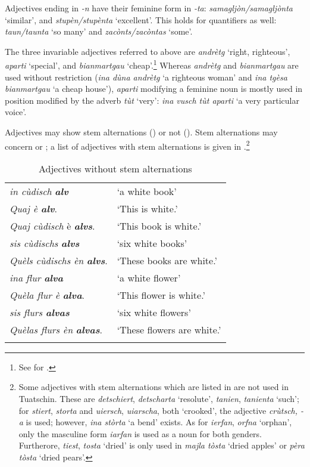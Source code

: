 Adjectives ending in \textit{-n} have their feminine form in \textit{-ta}: \textit{samagljòn/samagljònta} `similar', and  \textit{stupèn/stupènta} `excellent'. This holds for quantifiers as well: \textit{taun{\slash}taun\-ta} `so many' and \textit{zacònts/zacòntas} `some'.

The three invariable adjectives referred to above are \textit{andrètg} `right, righteous', \textit{aparti} `special', and \textit{bianmartgau} `cheap'.\footnote{See \citet[276]{Spescha1989} for .} Whereas \textit{andrètg} and \textit{bianmartgau} are used without restriction (\textit{ina dùna andrètg} `a righteous woman' and \textit{ina tgèsa bianmartgau} `a cheap house'), \textit{aparti} modifying a feminine noun is mostly used in  position modified by the adverb \textit{tùt} `very': \textit{ina vusch tùt aparti} `a very particular voice'.

Adjectives may show stem alternations  () or not (). Stem alternations may concern  or ; a list of adjectives with stem alternations is given in .\footnote{Some adjectives with stem alternations which are listed in \citet[282f.]{Spescha1989} are not used in Tuatschin. These are \textit{detschiert}, \textit{detscharta} `resolute', \textit{tanien}, \textit{tanienta} `such'; for \textit{stiert}, \textit{storta} and \textit{uiersch}, \textit{uiarscha}, both `crooked', the adjective \textit{crùtsch, -a} is used; however, \textit{ina stòrta} `a bend' exists. As for \textit{ierfan}, \textit{orfna} `orphan', only the masculine form \textit{iarfan} is used as a noun for both genders. Furtherore, \textit{tiest}, \textit{tosta} `dried' is only used in \textit{majla tòsta} `dried apples' or \textit{pèra tòsta} `dried pears'.}

\begin{table}
\caption{Adjectives without stem alternations}
\label{tab:adj:nostemalternations}
 \begin{tabular}{ll}
  \lsptoprule
 \textit{in cùdisch} \textbf{\textit{alv}} & `a white book'\\
\textit{Quaj è \textbf{alv}}. & `This is white.'\\
\textit{Quaj cùdisch} è \textbf{\textit{alvs}}. & `This book is white.'\\
\textit{sis cùdischs} \textbf{\textit{alvs}} & `six white books'\\
\textit{Quèls cùdischs èn} \textbf{\textit{alvs}}. & `These books are white.'\\
\textit{ina flur} \textbf{\textit{alva}} & `a white flower'\\
\textit{Quèla flur è} \textbf{\textit{alva}}. & `This flower is white.'\\
\textit{sis flurs \textbf{alvas}} & `six white flowers'\\
\textit{Quèlas flurs èn} \textbf{\textit{alvas}}. & `These flowers are white.'\\
  \lspbottomrule
 \end{tabular}
\end{table}

